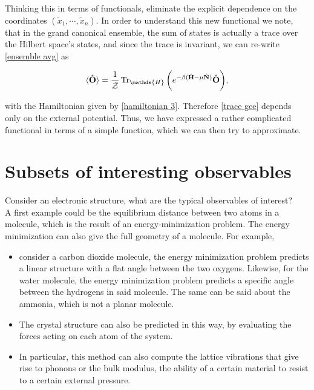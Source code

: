 \documentclass{homework}
\begin{document}
Thinking this in terms of functionals, eliminate the explicit dependence on the coordinates $(\tilde{x}_1, \cdots, \tilde{x}_n)$. In order to understand this new functional we note, that in the grand canonical ensemble, the sum of states is actually a trace over the Hilbert space's states, and since the trace is invariant, we can re-write \eqref{ensemble avg} as 

\begin{equation}
    \langle \hat{\bf O} \rangle = \frac{1}{\mathcal{Z}} \Tr_{\mathds{H}} \bigg(e^{-\beta(\hat{\bf H}-\mu\hat{\bf N})} \hat{\bf O} \bigg),
\label{trace gce}
\end{equation}

with the Hamiltonian given by \eqref{hamiltonian 3}. Therefore \eqref{trace gce} depends only on the external potential. Thus, we have expressed a rather complicated functional in terms of a simple function, which we can then try to approximate.

\section{Subsets of interesting observables}

Consider an electronic structure, what are the typical observables of interest? \\

A first example could be the equilibrium distance between two atoms in a molecule, which is the result of an energy-minimization problem. The energy minimization can also give the full geometry of a molecule. 
For example, 

\begin{itemize}
    \item consider a carbon dioxide molecule, the energy minimization problem predicts a linear structure with a flat angle between the two oxygens. Likewise, for the water molecule, the energy minimization problem predicts a specific angle between the hydrogens in said molecule. The same can be said about the ammonia, which is not a planar molecule. 
    \item The crystal structure can also be predicted in this way, by evaluating the forces acting on each atom of the system.
    \item In particular, this method can also compute the lattice vibrations that give rise to phonons or the bulk modulus, the ability of a certain material to resist to a certain external pressure. \\
\end{itemize}
\end{document}
